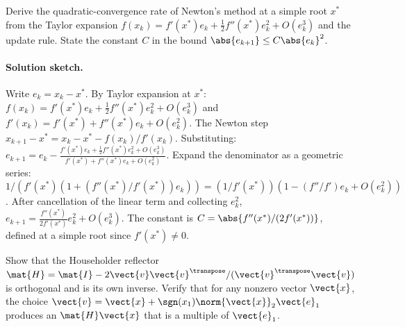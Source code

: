 \begin{exercise}
Derive the quadratic-convergence rate of Newton's method at a
simple root $x^{*}$ from the Taylor expansion $f(x_{k}) = f'(x^{*})
e_{k} + \frac{1}{2} f''(x^{*}) e_{k}^{2} + O(e_{k}^{3})$ and the
update rule. State the constant $C$ in the bound $\abs{e_{k+1}}
\leq C \abs{e_{k}}^{2}$.
\end{exercise}

\paragraph{Solution sketch.}
Write $e_{k} = x_{k} - x^{*}$. By Taylor expansion at $x^{*}$:
$f(x_{k}) = f'(x^{*}) e_{k} + \frac{1}{2} f''(x^{*}) e_{k}^{2}
+ O(e_{k}^{3})$ and $f'(x_{k}) = f'(x^{*}) + f''(x^{*}) e_{k}
+ O(e_{k}^{2})$. The Newton step
$x_{k+1} - x^{*} = x_{k} - x^{*} - f(x_{k})/f'(x_{k})$. Substituting:
$e_{k+1} = e_{k} - \frac{f'(x^{*}) e_{k} + \frac{1}{2} f''(x^{*})
e_{k}^{2} + O(e_{k}^{3})}{f'(x^{*}) + f''(x^{*}) e_{k} + O(e_{k}^{2})}$.
Expand the denominator as a geometric series:
$1/(f'(x^{*}) (1 + (f''(x^{*})/f'(x^{*})) e_{k}))
= (1/f'(x^{*})) (1 - (f''/f') e_{k} + O(e_{k}^{2}))$. After cancellation
of the linear term and collecting $e_{k}^{2}$,
$e_{k+1} = \frac{f''(x^{*})}{2 f'(x^{*})} e_{k}^{2} + O(e_{k}^{3})$.
The constant is $C = \abs{f''(x^{*}) / (2 f'(x^{*}))}$, defined at a
simple root since $f'(x^{*}) \neq 0$.

\begin{exercise}
Show that the Householder reflector $\mat{H} = \mat{I} - 2
\vect{v}\vect{v}^{\transpose}/(\vect{v}^{\transpose}\vect{v})$ is
orthogonal and is its own inverse. Verify that for any nonzero
vector $\vect{x}$, the choice $\vect{v} = \vect{x} + \sgn(x_{1})
\norm{\vect{x}}_{2} \vect{e}_{1}$ produces an $\mat{H}\vect{x}$
that is a multiple of $\vect{e}_{1}$.
\end{exercise}

